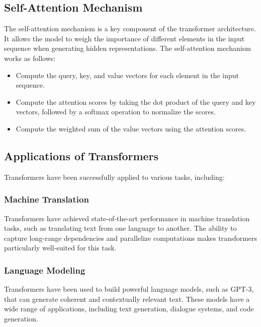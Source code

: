 \documentclass[12pt]{article}
\begin{document}
\subsection{Self-Attention Mechanism}
The self-attention mechanism is a key component of the transformer architecture. It allows the model to weigh the importance of different elements in the input sequence when generating hidden representations. The self-attention mechanism works as follows:
\begin{itemize}
    \item Compute the query, key, and value vectors for each element in the input sequence.
    \item Compute the attention scores by taking the dot product of the query and key vectors, followed by a softmax operation to normalize the scores.
    \item Compute the weighted sum of the value vectors using the attention scores.
\end{itemize}

\subsection{Applications of Transformers}
Transformers have been successfully applied to various tasks, including:

\subsubsection{Machine Translation}
Transformers have achieved state-of-the-art performance in machine translation tasks, such as translating text from one language to another. The ability to capture long-range dependencies and parallelize computations makes transformers particularly well-suited for this task.

\subsubsection{Language Modeling}
Transformers have been used to build powerful language models, such as GPT-3, that can generate coherent and contextually relevant text. These models have a wide range of applications, including text generation, dialogue systems, and code generation.
\end{document}
